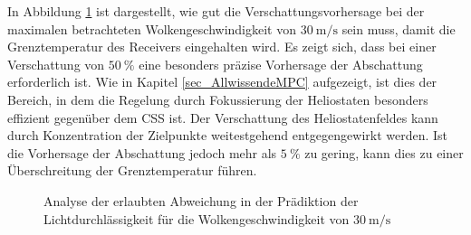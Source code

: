 In Abbildung \ref{fig_shadingsafe} ist dargestellt, wie gut die Verschattungsvorhersage bei der maximalen betrachteten Wolkengeschwindigkeit von $\SI{30}{\metre\per\second}$ sein muss, damit die Grenztemperatur des Receivers eingehalten wird.
Es zeigt sich, dass bei einer Verschattung von $\SI{50}{\percent}$ eine besonders präzise Vorhersage der Abschattung erforderlich ist.
Wie in Kapitel \ref{sec_AllwissendeMPC} aufgezeigt, ist dies der Bereich, in dem die Regelung durch Fokussierung der Heliostaten besonders effizient gegenüber dem CSS ist.
Der Verschattung des Heliostatenfeldes kann durch Konzentration der Zielpunkte weitestgehend entgegengewirkt werden.
Ist die Vorhersage der Abschattung jedoch mehr als $\SI{5}{\percent}$ zu gering, kann dies zu einer Überschreitung der Grenztemperatur führen.

\enlargethispage{\baselineskip}
\begin{figure}[h!]
    \centering
    \setlength{\fboxsep}{1pt}
    \setlength{\fboxrule}{1pt}
\caption[Analyse der erlaubten Abweichung in der Prädiktion der Lichtdurchlässigkeit für die Wolkengeschwindigkeit von $\SI{30}{\metre\per\second}$]{Analyse der erlaubten Abweichung in der Prädiktion der Lichtdurchlässigkeit für die Wolkengeschwindigkeit von $\SI{30}{\metre\per\second}$}
    \label{fig_shadingsafe}
\end{figure}

